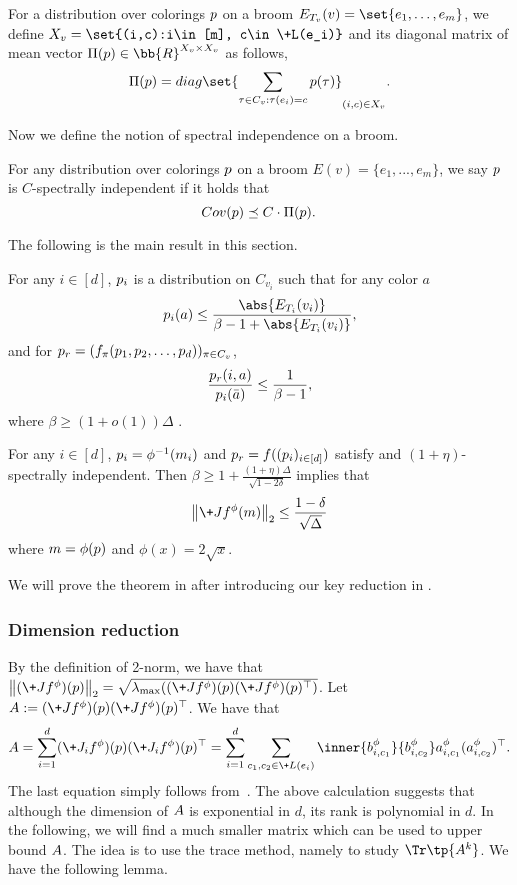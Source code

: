 \documentclass[a4paper,11pt]{article}
\renewcommand{\norm}[1]{\left\|#1\right\|}
\begin{document}
\begin{definition}\label{def:diag_mean}
    For a distribution over colorings $\*p$ on a broom $E_{T_v}(v)=\set{e_1,\dots,e_m}$, we define $X_v=\set{(i,c):i\in [m], c\in \+L(e_i)}$ and  its diagonal matrix of mean vector $\Pi(\*p)\in \bb{R}^{X_v\times X_v}$ as follows,
    $$
        \Pi(\*p) = \-{diag}\set{\sum_{\tau\in C_v: \tau(e_i) = c}\*p(\tau)}_{(i,c)\in X_v}.
    $$
\end{definition}
Now we define the notion of spectral independence on a broom.
\begin{definition}\label{def:sepctral_independence}
    For any distribution over colorings $\*p$ on a broom $E(v) = \{e_1,...,e_m\}$, we say $\*p$ is $C$-spectrally independent if it holds that
    $$
         \!{Cov}(\*p) \preceq C\cdot \Pi(\*p).
    $$
\end{definition}
The following is the main result in this section.
\begin{condition}\label{cond:marginal}
    For any $i\in [d]$, $\*p_i$ is a distribution on $C_{v_i}$ such that for any color $a$
\[
\*p_i(a)\leq \frac{\abs{E_{T_i}(v_i)}}{\beta -1 +\abs{E_{T_i}(v_i)}},
\]
and for $\*p_r = (f_\pi(\*p_1,\*p_2, \dots, \*p_d))_{\pi \in C_v}$,
\[
\frac{\*p_r(i,a)}{\*p_i(\bar{a})}\leq \frac{1}{\beta -1},
\]
where $\beta \geq (1+o(1))\Delta$ .
\end{condition}

\begin{theorem}\label{thm:bound_Jacobian}
For any $i\in [d]$, $\*p_i = \phi^{-1}(\*m_i)$ and $\*p_r = f((\*p_i)_{i\in[d]})$ satisfy  and $(1 + \eta)$-spectrally independent. Then $\beta \geq 1 + \frac{(1 + \eta)\Delta}{\sqrt{1 - 2\delta}}$ implies that 
    $$
        \norm{\+J f^\phi(\*m)}_2 \leq \frac{1-\delta}{\sqrt \Delta}
    $$
    where $\*m = \phi(\*p)$ and $\phi(x) = 2\sqrt{x}$.
\end{theorem}

We will prove the theorem in  after introducing our key reduction in .

\subsubsection{Dimension reduction}\label{sec:dim}
By the definition of 2-norm, we have that $\norm{(\+J f^\phi)(\*p)}_2 = \sqrt{\lambda_{\max}( (\+J f^\phi)(\*p)(\+J f^\phi)(\*p)^\top )}$. Let $\*A := (\+J f^\phi)(\*p)(\+J f^\phi)(\*p)^\top$. We have that
\begin{align*}\label{eq:2norm_J}                 
    \*A
    = \sum_{i=1}^d  (\+J_i f^\phi)(\*p)(\+J_i f^\phi)(\*p)^\top
    = \sum_{i=1}^d \sum_{c_1,c_2\in \+L({e_i})} \inner{\*b_{i,c_1}^\phi}{\*b_{i,c_2}^\phi} \*a_{i,c_1}^\phi (\*a_{i,c_2}^\phi)^\top.
\end{align*}
The last equation simply follows from~. The above calculation suggests that although the dimension of $\*A$ is exponential in $d$, its rank is polynomial in $d$. In the following, we will find a much smaller matrix which can be used to upper bound $\*A$. The idea is to use the trace method, namely to study $\Tr\tp{\*A^k}$. We have the following lemma.
\end{document}
